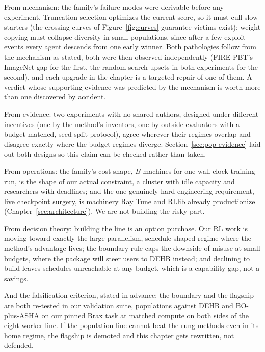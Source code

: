 From mechanism: the family's failure modes were derivable before any
experiment. Truncation selection optimizes the current score, so it
must cull slow starters (the crossing curves of
Figure~\ref{fig:curves} guarantee victims exist); weight copying must
collapse diversity in small populations, since after a few exploit
events every agent descends from one early winner. Both pathologies
follow from the mechanism as stated, both were then observed
independently (FIRE-PBT's ImageNet gap for the first, the
random-search upsets in both experiments for the second), and each
upgrade in the chapter is a targeted repair of one of them. A verdict
whose supporting evidence was predicted by the mechanism is worth
more than one discovered by accident.

From evidence: two experiments with no shared authors, designed under
different incentives (one by the method's inventors, one by outside
evaluators with a budget-matched, seed-split protocol), agree
wherever their regimes overlap and disagree exactly where the budget
regimes diverge. Section~\ref{sec:pop-evidence} laid out both designs
so this claim can be checked rather than taken.

From operations: the family's cost shape, $B$ machines for one
wall-clock training run, is the shape of our actual constraint, a
cluster with idle capacity and researchers with deadlines; and the
one genuinely hard engineering requirement, live checkpoint surgery,
is machinery Ray Tune and RLlib already productionize
(Chapter~\ref{sec:architecture}). We are not building the risky part.

From decision theory: building the line is an option purchase. Our RL
work is moving toward exactly the large-parallelism,
schedule-shaped regime where the method's advantage lives; the
boundary rule caps the downside of misuse at small budgets, where the
package will steer users to DEHB instead; and declining to build
leaves schedules unreachable at any budget, which is a capability
gap, not a savings.

And the falsification criterion, stated in advance: the boundary and
the flagship are both re-tested in our validation suite, populations
against DEHB and BO-plus-ASHA on our pinned Brax task at matched
compute on both sides of the eight-worker line. If the population
line cannot beat the rung methods even in its home regime, the
flagship is demoted and this chapter gets rewritten, not defended.

